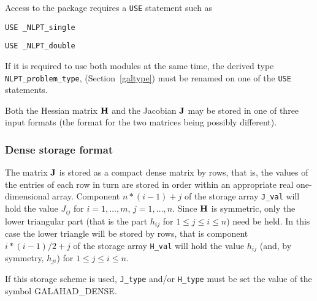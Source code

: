 \documentclass{galahad}
\newcommand{\packagename}{NLPT}
\newcommand{\fullpackagename}{\libraryname\_\packagename}
\newcommand{\sym}{\sf\small}
\begin{document}

\galhowto


Access to the package requires a {\tt USE} statement such as

\medskip{}

\hspace{8mm} {\tt USE \fullpackagename\_single}

\medskip{}

\hspace{8mm} {\tt USE \fullpackagename\_double}

\medskip

\noindent
If it is required to use both modules at the same time, the derived type
{\tt NLPT\_problem\_type}, 
(Section~\ref{galtype})
must be renamed on one of the {\tt USE} statements.


\galmatrix
Both the Hessian matrix ${\mathbf{H}}$ and the Jacobian ${\mathbf{J}}$
may be stored in one of three input formats (the format for the two matrices
being possibly different).

\subsubsection{Dense storage format}\label{dense}

The matrix ${\mathbf{J}}$ is stored as a compact 
dense matrix by rows, that is, the values of the entries of each row in turn are
stored in order within an appropriate real one-dimensional array.
Component $n \ast (i-1) + j$ of the storage array {\tt J\_val} will hold the 
value $J_{ij}$ for $i = 1, \ldots , m$, $j = 1, \ldots , n$.
Since ${\mathbf{H}}$ is symmetric, only the lower triangular part (that is the part 
$h_{ij}$ for $1 \leq j \leq i \leq n$) need be held. In this case
the lower triangle will be stored by rows, that is 
component $i \ast (i-1)/2 + j$ of the storage array {\tt H\_val}  
will hold the value $h_{ij}$ (and, by symmetry, $h_{ji}$)
for $1 \leq j \leq i \leq n$.

\noindent
If this storage scheme is used, {\tt J\_type} and/or {\tt H\_type} must be set
the value of the symbol {\sym GALAHAD\_DENSE}.
\end{document}
